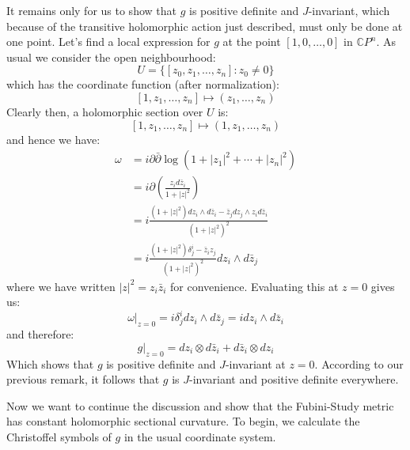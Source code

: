\documentclass[11pt]{amsart}
\theoremstyle{definition}
\def \CP{ \mathbb{C}P }
\def \del{ \partial }
\def \delbar{ \bar{\partial} }
\begin{document}
It remains only for us to show that $g$ is positive definite and $J$-invariant, which because of the transitive holomorphic action just described, must only be done at one point.  Let's find a local expression for $g$ at the point $[1,0, \ldots, 0]$ in $\CP^n$.  As usual we consider the open neighbourhood:
%
$$U = \{ [z_0,z_1, \ldots, z_n]: z_0 \neq 0 \} $$
%
which has the coordinate function (after normalization):
%
$$[1,z_1, \ldots, z_n] \mapsto (z_1, \ldots, z_n)$$
%
Clearly then, a holomorphic section over $U$ is:
%
$$[1,z_1, \ldots, z_n] \mapsto (1,z_1, \ldots, z_n)$$
%
and hence we have:
%
\begin{align*}
\omega &= i \del \delbar \log( 1 + |z_1|^2 + \cdots + |z_n|^2 ) \\
&= i \del \left( \frac{ z_i d\bar{z}_i }{ 1 + |z|^2 } \right) \\
&= i \frac{ (1 + |z|^2 ) dz_i \wedge d \bar{z}_i - \bar{z}_j d z_j \wedge z_i d \bar{z}_i }{ (1 + |z|^2 )^2 } \\
&= i \frac{ (1 + |z|^2)\delta^i_j - \bar{z}_i z_j }{ (1 + |z|^2)^2 } d z_i \wedge d \bar{z}_j
\end{align*}
%
where we have written $|z|^2 = z_i \bar{z}_i$ for convenience.  Evaluating this at $z=0$ gives us:
%
$$ \omega|_{z=0} = i \delta^i_j dz_i \wedge d \bar{z}_j = i dz_i \wedge d \bar{z}_i $$
%
and therefore:
%
$$ g|_{z=0} = dz_i \otimes d \bar{z}_i + d \bar{z}_i \otimes d z_i $$
%
Which shows that $g$ is positive definite and $J$-invariant at $z=0$.  According to our previous remark, it follows that $g$ is $J$-invariant and positive definite everywhere.

Now we want to continue the discussion and show that the Fubini-Study metric has constant holomorphic sectional curvature.  To begin, we calculate the Christoffel symbols of $g$ in the usual coordinate system.  
\end{document}
